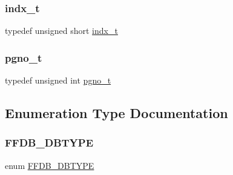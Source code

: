 \subsubsection{\texorpdfstring{indx\_t}{indx\_t}}
{\footnotesize\ttfamily typedef unsigned short \mbox{\hyperlink{adat-devel_2other__libs_2filedb_2filehash_2ffdb__db_8h_a09ffd06672b99d3312cd7e19d4b05e45}{indx\+\_\+t}}}

\mbox{\label{adat-devel_2other__libs_2filedb_2filehash_2ffdb__db_8h_a000813331643d38481142bcce7de1501}} 
\subsubsection{\texorpdfstring{pgno\_t}{pgno\_t}}
{\footnotesize\ttfamily typedef unsigned int \mbox{\hyperlink{adat-devel_2other__libs_2filedb_2filehash_2ffdb__db_8h_a000813331643d38481142bcce7de1501}{pgno\+\_\+t}}}



\subsection{Enumeration Type Documentation}
\mbox{\label{adat-devel_2other__libs_2filedb_2filehash_2ffdb__db_8h_ad525b587adc6d7028c6f7bf7e8204185}} 
\subsubsection{\texorpdfstring{FFDB\_DBTYPE}{FFDB\_DBTYPE}}
{\footnotesize\ttfamily enum \mbox{\hyperlink{adat-devel_2other__libs_2filedb_2filehash_2ffdb__db_8h_ad525b587adc6d7028c6f7bf7e8204185}{F\+F\+D\+B\+\_\+\+D\+B\+T\+Y\+PE}}}

